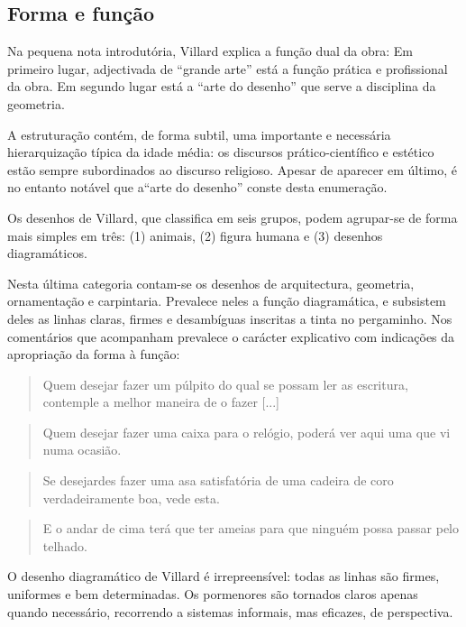 \documentclass{article}
\begin{document}
\subsection{Forma e função}

Na pequena nota introdutória, Villard explica a função dual da obra:
Em primeiro lugar, adjectivada de ``grande arte'' está a função
prática e profissional da obra. Em segundo lugar está a ``arte do
desenho'' que serve a disciplina da geometria.

A estruturação contém, de forma subtil, uma importante e necessária
hierarquização típica da idade média: os discursos prático-científico
e estético estão sempre subordinados ao discurso religioso. Apesar de
aparecer em último, é no entanto notável que a``arte do desenho''
conste desta enumeração.

Os desenhos de Villard, que \cite{teresa} classifica em seis grupos,
podem agrupar-se de forma mais simples em três: (1) animais, (2)
figura humana e (3) desenhos diagramáticos.

Nesta última categoria contam-se os desenhos de arquitectura,
geometria, ornamentação e carpintaria. Prevalece neles a função
diagramática, e subsistem deles as linhas claras, firmes e desambíguas
inscritas a tinta no pergaminho. Nos comentários que acompanham
prevalece o carácter explicativo com indicações da apropriação da
forma à função:

\begin{quote}
  Quem desejar fazer um púlpito do qual se possam ler as escritura,
  contemple a melhor maneira de o fazer [...]  \cite[p. 13]{villard}
\end{quote}

\begin{quote}
  Quem desejar fazer uma caixa para o relógio, poderá ver aqui uma
  que vi numa ocasião. \cite[p. 12]{villard}
\end{quote}

\begin{quote} Se desejardes fazer uma asa satisfatória de uma cadeira
de coro verdadeiramente boa, vede esta. \cite[p. 14]{villard}
\end{quote}

\begin{quote} E o andar de cima terá que ter ameias para que ninguém
  possa passar pelo telhado. \cite[p. 20]{villard}
\end{quote}

O desenho diagramático de Villard é irrepreensível: todas as linhas são
firmes, uniformes e bem determinadas. Os pormenores são tornados
claros apenas quando necessário, recorrendo a sistemas informais, mas
eficazes, de perspectiva.
\end{document}
